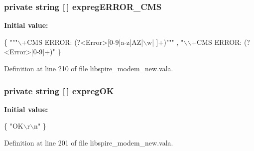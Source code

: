 \hypertarget{classedwinspire_1_1_ports_1_1_modem_a92b41554d42044c9031e61e6fc4f9da1}{
\subsubsection[{expreg\-E\-R\-R\-O\-R\-\_\-\-C\-M\-S}]{\setlength{\rightskip}{0pt plus 5cm}private string \mbox{[}$\,$\mbox{]} expreg\-E\-R\-R\-O\-R\-\_\-\-C\-M\-S\hspace{0.3cm}{\ttfamily [private]}}}\label{classedwinspire_1_1_ports_1_1_modem_a92b41554d42044c9031e61e6fc4f9da1}
{\bfseries Initial value\-:}
\begin{DoxyCode}
 \{
                                \textcolor{stringliteral}{""}\textcolor{stringliteral}{"\(\backslash\)+CMS ERROR: (?<Error>[0-9|a-z|AZ|\(\backslash\)w| ]+)"}\textcolor{stringliteral}{""}
      ,
                                \textcolor{stringliteral}{"\(\backslash\)\(\backslash\)+CMS ERROR: (?<Error>[0-9]+)"}
                        \}
\end{DoxyCode}


Definition at line 210 of file libspire\-\_\-modem\-\_\-new.\-vala.

\hypertarget{classedwinspire_1_1_ports_1_1_modem_a254ea7e3e4344022aa0d7a0e0b3d5003}{
\subsubsection[{expreg\-O\-K}]{\setlength{\rightskip}{0pt plus 5cm}private string \mbox{[}$\,$\mbox{]} expreg\-O\-K\hspace{0.3cm}{\ttfamily [private]}}}\label{classedwinspire_1_1_ports_1_1_modem_a254ea7e3e4344022aa0d7a0e0b3d5003}
{\bfseries Initial value\-:}
\begin{DoxyCode}
 \{
                                \textcolor{stringliteral}{"OK\(\backslash\)r\(\backslash\)n"}
                        \}
\end{DoxyCode}


Definition at line 201 of file libspire\-\_\-modem\-\_\-new.\-vala.

